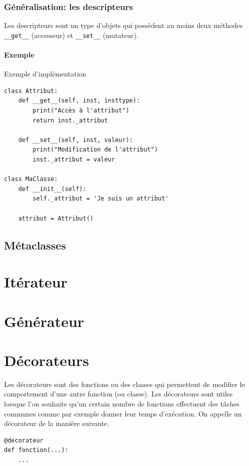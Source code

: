 \documentclass[a4paper, 10pt]{article}
\newcommand{\code}[1]{{\small\texttt{#1}}}
\begin{document}
\subsubsection{Généralisation: les descripteurs}
Les descripteurs sont un type d'objets qui possèdent au moins deux méthodes \code{\_\_get\_\_} (accesseur) et \code{\_\_set\_\_} (mutateur).
\paragraph{Exemple} Exemple d'implémentation
\begin{verbatim}
class Attribut:
    def __get__(self, inst, insttype):
        print("Accès à l'attribut")
        return inst._attribut

    def __set__(self, inst, valeur):
        print("Modification de l'attribut")
        inst._attribut = valeur

class MaClasse:
    def __init__(self):
        self._attribut = 'Je suis un attribut'

    attribut = Attribut()
\end{verbatim}
\subsection{Métaclasses}

\section{Itérateur}
\section{Générateur}
\section{Décorateurs}
Les décorateurs sont des fonctions ou des classes qui permettent de modifier le comportement d'une autre fonction (ou classe). Les décorateurs sont utiles lorsque l'on souhaite qu'un certain nombre de fonctions effectuent des t\^aches communes comme par exemple donner leur temps d'exécution. On appelle un décorateur de la manière suivante.

\begin{verbatim}
@decorateur
def fonction(...):
    ...
\end{verbatim}
\end{document}
